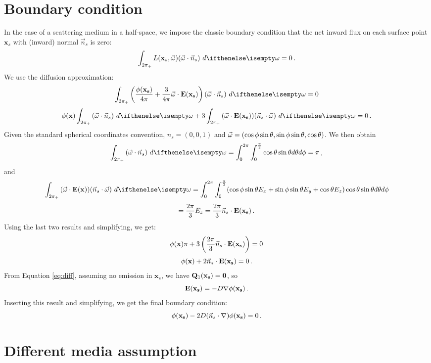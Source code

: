 \documentclass[10pt,a4paper]{article}
\begin{document}
\section{Boundary condition}

In the case of a scattering medium in a half-space, we impose the classic boundary condition that the net inward flux on each surface point $\mathbf{x}_s$ with (inward) normal $\vec{n}_s$ is zero:
$$
\hemisphere{L(\mathbf{x}_s, \omegavec) (\omegavec \cdot \vec{n}_s)}{} = 0 \, .
$$
We use the diffusion approximation:
$$
\hemisphere{\left(\frac{\func{\phi}{\mathbf{x}_s}}{4\pi} + \frac{3}{4\pi} \omegavec \cdot \vecfunc{E}{\mathbf{x}_s}\right) (\omegavec \cdot \vec{n}_s)}{} = 0
$$
$$
\xfunc{\phi} \hemisphere{ (\omegavec \cdot \vec{n}_s)}{} + 3  \hemisphere{(\omegavec \cdot \vecfunc{E}{\mathbf{x}_s}) (\vec{n}_s \cdot \omegavec) }{} = 0 \, .
$$
Given the standard spherical coordinates convention, $n_s = (0,0,1)$ and $\vec{\omega} = (\cos\phi\sin\theta,\sin\phi\sin\theta,\cos\theta)$. We then obtain
$$
\hemisphere{ (\omegavec \cdot \vec{n}_s)}{} = \int_{0}^{2\pi} \int_{0}^{\frac{\pi}{2}} \cos\theta \sin\theta d\theta d\phi = \pi \, ,
$$
and
$$
\hemisphere{(\omegavec \cdot \xvecfunc{E}) (\vec{n}_s \cdot \omegavec) }{} = \int_{0}^{2\pi} \int_{0}^{\frac{\pi}{2}}(\cos\phi\sin\theta E_x+\sin\phi\sin\theta E_y+\cos\theta E_z) \cos\theta \sin\theta d\theta d\phi
$$
$$
= \frac{2\pi}{3} E_z = \frac{2\pi}{3} \vec{n}_s \cdot \mathbf{E}(\mathbf{\mathbf{x}_s}) \, .
$$
Using the last two results and simplifying, we get:
$$
{\phi}(\mathbf{x}) \pi + 3 \left(\frac{2\pi}{3} \vec{n}_s \cdot \mathbf{E}(\mathbf{\mathbf{x}_s})\right)= 0
$$
$$
{\phi}(\mathbf{x}) + 2 \vec{n}_s \cdot \mathbf{E}(\mathbf{\mathbf{x}_s}) = 0 \, .
$$
From Equation \ref{eq:diff}, assuming no emission in $\mathbf{x}_s$, we have $\mathbf{Q}_1(\mathbf{\mathbf{x}_s}) = \mathbf{0}$, so
$$
\mathbf{E}(\mathbf{\mathbf{x}_s}) = - D{\nabla} {\phi}(\mathbf{\mathbf{x}_s}) \, .
$$
Inserting this result and simplifying, we get the final boundary condition:
$$
{\phi}(\mathbf{\mathbf{x}_s}) - 2 D (\vec{n}_s \cdot {\nabla}) {\phi}(\mathbf{\mathbf{x}_s}) = 0 \, .
$$

\section{Different media assumption}
\end{document}
